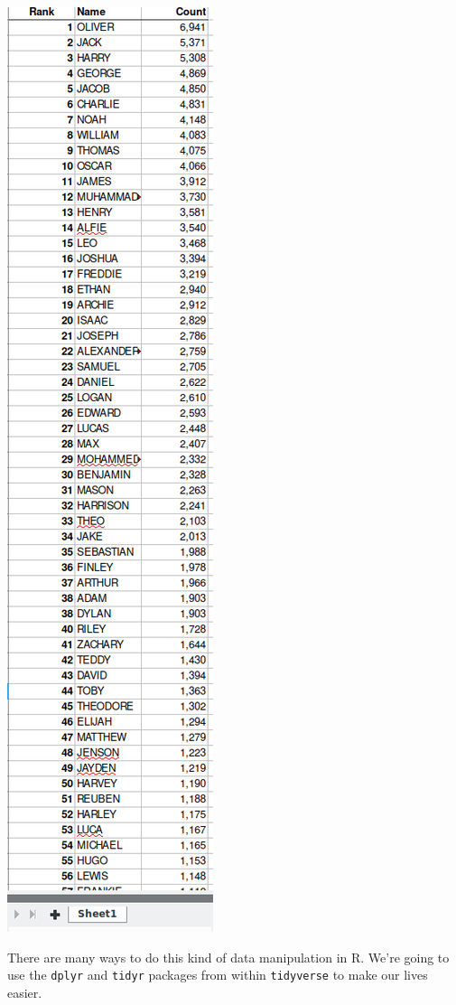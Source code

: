 \documentclass[
]{book}
\begin{document}
\includegraphics{R/RDataWrangling/images/clean.png}

There are many ways to do this kind of data manipulation in R. We're
going to use the \texttt{dplyr} and \texttt{tidyr} packages from within \texttt{tidyverse}
to make our lives easier.
\end{document}
